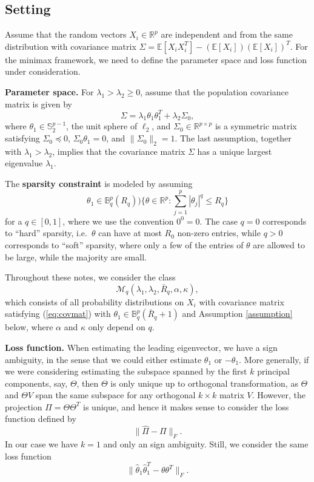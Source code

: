 \documentclass[11pt]{article}
\newcommand{\R}{\mathbb{R}}
\newcommand{\E}{\mathbb{E}}
\newcommand{\B}{\mathbb{B}}
\begin{document}
\subsection{Setting}
Assume that the random vectors $X_i\in\R^p$ are independent and from the same distribution with covariance matrix $\Sigma = \E[X_iX_i^T] - (\E[X_i])(\E[X_i])^T$. For the minimax framework, we need to define the parameter space and loss function under consideration.

\textbf{Parameter space.} For $\lambda_1 > \lambda_2\ge 0$, assume that the population covariance matrix is given by
\begin{equation}\label{eq:covmat}
\Sigma = \lambda_1\theta_1\theta_1^T + \lambda_2\Sigma_0,
\end{equation}
where $\theta_1\in \mathbb{S}_2^{p-1}$, the unit sphere of $\ell_2$, and $\Sigma_0\in \R^{p\times p}$ is a symmetric matrix satisfying $\Sigma_0\preceq 0$, $\Sigma_0\theta_1 = 0$, and $\|\Sigma_0\|_2 = 1$. The last assumption, together with $\lambda_1>\lambda_2$, implies that the covariance matrix $\Sigma$ has a unique largest eigenvalue $\lambda_1$.

The \textbf{sparsity constraint} is modeled by assuming 
\begin{equation*}
\theta_1\in \B^p_q(R_q) ) \{\theta\in \R^p: \sum_{j=1}^p |\theta_j|^q\le R_q\}
\end{equation*}
for a $q\in [0,1]$, where we use the convention $0^0=0$. The case $q=0$ corresponds to ``hard'' sparsity, i.e.\ $\theta$ can have at most $R_0$ non-zero entries, while $q>0$ corresponds to ``soft'' sparsity, where only a few of the entries of $\theta$ are allowed to be large, while the majority are small.

Throughout these notes, we consider the class 
\begin{equation*}
\mathcal{M}_q (\lambda_1, \lambda_2, \bar R_q, \alpha, \kappa),
\end{equation*}
which consists of all probability distributions on $X_i$ with covariance matrix satisfying (\ref{eq:covmat}) with $\theta_1\in \B^p_q(\bar R_q + 1)$ and Assumption \ref{assumption} below, where $\alpha$ and $\kappa$ only depend on $q$.

\textbf{Loss function.} When estimating the leading eigenvector, we have a sign ambiguity, in the sense that we could either estimate $\theta_1$ or $-\theta_1$. More generally, if we were considering estimating the subspace spanned by the first $k$ principal components, say, $\Theta$, then $\Theta$ is only unique up to orthogonal transformation, as $\Theta$ and $\Theta V$ span the same subspace for any orthogonal $k\times k$ matrix $V$. However, the projection $\Pi = \Theta\Theta^T$ is unique, and hence it makes sense to consider the loss function defined by 
\begin{equation*}
\|\widehat{\Pi} - \Pi\|_F.
\end{equation*}
In our case we have $k=1$ and only an sign ambiguity. Still, we consider the same loss function
\begin{equation*}
\|\hat{\theta}_1\hat\theta_1^T - \theta\theta^T\|_F.
\end{equation*}
\end{document}
